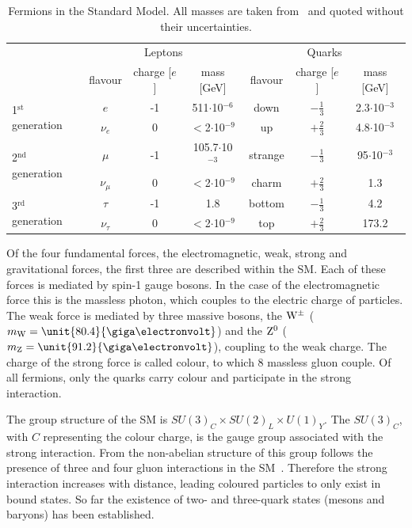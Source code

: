 \begin{table}
\centering
 \renewcommand{\arraystretch}{1.3}
\caption{Fermions in the Standard Model. All masses are taken from~\cite{PDG} and quoted without their uncertainties.}
\label{tab:fermions}
\begin{tabular}{l|c c c | c c c }
  & \multicolumn{3}{c|}{Leptons} & \multicolumn{3}{c}{Quarks} \\
    & flavour & charge [$e$] & mass [GeV] & flavour & charge [$e$] & mass [GeV] \\
    \hline
  \multirow{2}{*}{1$^{\mathrm{st}}$ generation} & $e$ & -1 & 511$\cdot$10$^{\mathrm{-6}}$ &  down & $-\frac{1}{3}$ & 2.3$\cdot$10$^{-3}$ \\
 												& $\nu_e$ & 0 & $<$2$\cdot$10$^{\mathrm{-9}}$ &  up & $+\frac{2}{3}$ & 4.8$\cdot$10$^{-3}$  \\
 												\hline
  \multirow{2}{*}{2$^{\mathrm{nd}}$ generation} & $\mu$ & -1  & 105.7$\cdot$10$^{\mathrm{-3}}$ & strange & $-\frac{1}{3}$ & 95$\cdot$10$^{-3}$ \\
 												& $\nu_{\mu}$ & 0 & $<$2$\cdot$10$^{\mathrm{-9}}$ & charm & $+\frac{2}{3}$ & 1.3 \\
 												\hline
  \multirow{2}{*}{3$^{\mathrm{rd}}$ generation} & $\tau$ & -1 & 1.8 & bottom & $-\frac{1}{3}$ & 4.2\\
 												& $\nu_{\tau}$ & 0 & $<$2$\cdot$10$^{\mathrm{-9}}$ & top & $+\frac{2}{3}$ & 173.2 \\ 												
 
 
\end{tabular}

\end{table}

Of the four fundamental forces, the electromagnetic, weak, strong and gravitational forces, the first three are described within the SM. Each of these forces is mediated by spin-1 gauge bosons. In the case of the electromagnetic force this is the massless photon, which couples to the electric charge of particles. The weak force is mediated by three massive bosons, the $\mathrm{W}^{\pm}$ ($m_{\W} = \unit{80.4}{\giga\electronvolt}$) and the $\mathrm{Z}^{0}$ ($m_{\mathrm{Z}} = \unit{91.2}{\giga\electronvolt}$), coupling to the weak charge. The charge of the strong force is called colour, to which 8 massless gluon couple. Of all fermions, only the quarks carry colour and participate in the strong interaction. 

The group structure of the SM is $SU(3)_C \times SU(2)_L \times U(1)_Y$. The $SU(3)_C$, with $C$ representing the colour charge, is the gauge group associated with the strong interaction. From the non-abelian structure of this group follows the presence of three and four gluon interactions in the SM~\cite{Pich:2007vu}. Therefore the strong interaction increases with distance, leading coloured particles to only exist in bound states. So far the existence of two- and three-quark states (mesons and baryons) has been established. 

